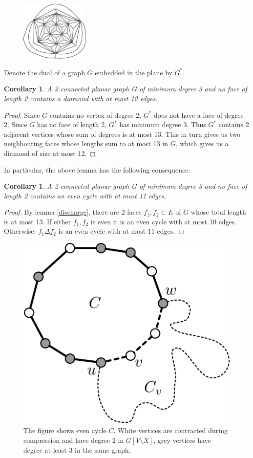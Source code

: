 \documentclass{article}
\newcommand{\0}{\mathbb{0}}
\newcommand{\1}{\mathbb{1}}
\newtheorem{cor}[theorem]{Corollary}
\begin{document}
 \begin{figure}
   \includegraphics[width=0.3\textwidth]{StellatedIcosehedron.pdf}
   \caption{}\label{StellatedIco}
 \end{figure}
Denote the dual of a graph $G$ embedded in the plane by $G^*$.   %
\begin{cor}\label{small diamond}
A 2 connected planar graph G of minimum degree 3 and no face of length 2 contains a diamond with at most 12 edges.
\end{cor}
\begin{proof}
 Since $G$ contains no vertex of degree 2, $G^*$ does not have a face of degree 2. Since $G$ has no face of length 2, $G^*$ has minimum degree 3. Thus $G^*$ contains 2 adjacent vertices whose sum of degrees is at most 13. This in turn  gives us two neighbouring faces whose lengths sum to at most 13 in $G$, which gives us a diamond of size at most 12.
\end{proof}


In particular, the above lemma has the following consequence:

\begin{cor}\label{cor:smallec}
  A 2 connected planar graph G of minimum degree 3 and no face of
  length 2 contains an even cycle with at most 11 edges.
\end{cor}
\begin{proof}
By lemma \ref{discharge}, there are 2 faces $f_1,f_2 \subset E$ of $G$ whose total length is at most 13. If either $f_1,f_2$ is even it is an even cycle with at most 10 edges. Otherwise,  $f_1 \Delta f_2$ is an even cycle with at most 11 edges.
\end{proof}


\begin{figure}
  \begin{center}
    \includegraphics[width=.3\textwidth]{simple-pd.pdf}
  \end{center}
  \caption{\label{fig:simplepd} The figure shows even cycle
    $C$. White vertices are contracted during compression and have
    degree 2 in $G[V\setminus X]$, grey vertices have degree at least
    3 in the same graph.}
\end{figure}
\end{document}
